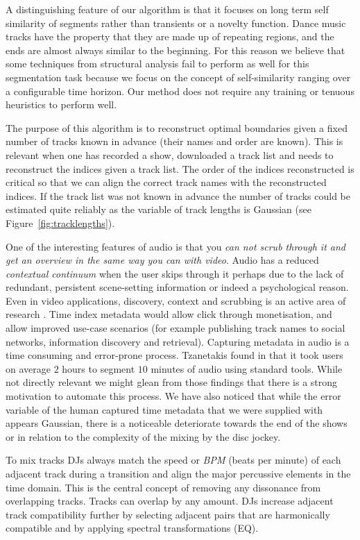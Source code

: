 \documentclass[twocolumn]{article}
\begin{document}
	A distinguishing feature of our algorithm is that it focuses on long term self similarity of segments rather than transients or a novelty function. Dance music tracks have the property that they are made up of repeating regions, and the ends are almost always similar to the beginning. For this reason we believe that some techniques from structural analysis fail to perform as well for this segmentation task because we focus on the concept of self-similarity ranging over a configurable time horizon. Our method does not require any training or tenuous heuristics to perform well. 
	
	The purpose of this algorithm is to reconstruct optimal boundaries given a fixed number of tracks known in advance (their names and order are known). This is relevant when one has recorded a show, downloaded a track list and needs to reconstruct the indices given a track list. The order of the indices reconstructed is critical so that we can align the correct track names with the reconstructed indices. If the track list was not known in advance the number of tracks could be estimated quite reliably as the variable of track lengths is Gaussian (see Figure~\ref{fig:tracklengths}).
	
	One of the interesting features of audio is that you \textit{can not scrub through it and get an overview in the same way you can with video}. Audio has a reduced \textit{contextual continuum} when the user skips through it perhaps due to the lack of redundant, persistent scene-setting information or indeed a psychological reason. Even in video applications, discovery, context and scrubbing is an active area of research \cite{Matejka:2013:SIO:2470654.2466149}. Time index metadata would allow click through monetisation, and allow improved use-case scenarios (for example publishing track names to social networks, information discovery and retrieval). Capturing metadata in audio is a time consuming and error-prone process. Tzanetakis found in \cite{tzanetakis1999framework} that it took users on average $2$ hours to segment $10$ minutes of audio using standard tools. While not directly relevant we might glean from those findings that there is a strong motivation to automate this process. We have also noticed that while the error variable of the human captured time metadata that we were supplied with appears Gaussian, there is a noticeable deteriorate towards the end of the shows or in relation to the complexity of the mixing by the disc jockey. 
	
	To mix tracks DJs always match the speed or \textit{BPM} (beats per minute) of each adjacent track during a transition and align the major percussive elements in the time domain. This is the central concept of removing any dissonance from overlapping tracks. Tracks can overlap by any amount. DJs increase adjacent track compatibility further by selecting adjacent pairs that are harmonically compatible and by applying spectral transformations (EQ).
	
\end{document}
